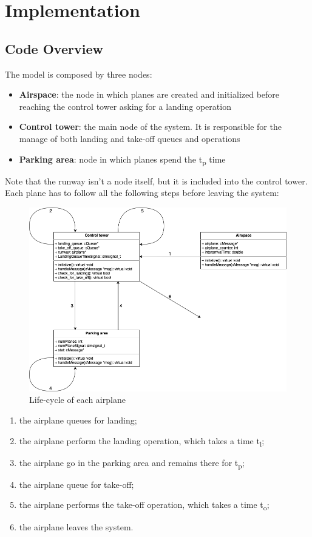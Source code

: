 \documentclass[12pt]{article}
\begin{document}
\section{Implementation}
\subsection{Code Overview}
The model is composed by three nodes:
\begin{itemize}
	\item \textbf{Airspace}: the node in which planes are created and initialized before reaching the control tower asking for a landing operation
	\item  \textbf{Control tower}: the main node of the system. It is responsible for the manage of both landing and take-off queues and operations
	\item  \textbf{Parking area}: node in which planes spend the t\textsubscript{p} time
\end{itemize}
Note that the runway isn't a node itself, but it is included into the control tower.
Each plane has to follow all the following steps before leaving the system:

\begin{figure}[h!]
    \centering
    \includegraphics[scale=0.45]{immagini/lifecycle}
    \caption{Life-cycle of each airplane}
    \label{fig:life-cycle of each airplane}
\end{figure}

\begin{enumerate}[label=\arabic*)]
	\item the airplane queues for landing;
	\item the airplane perform the landing operation, which takes a time t\textsubscript{l};
	\item the airplane go in the parking area and remains there for t\textsubscript{p};
	\item the airplane queue for take-off;
	\item the airplane performs the take-off operation, which takes a time t\textsubscript{o};
	\item the airplane leaves the system.
\end{enumerate}
\end{document}
